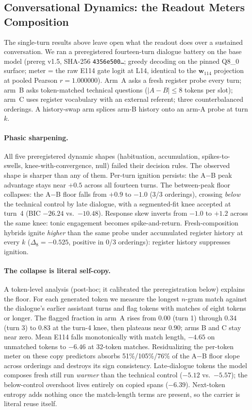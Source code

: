 \documentclass[10pt,a4paper,twocolumn]{article}
\newcommand{\wvec}{\mathbf{w}_{114}}
\begin{document}
\subsection{Conversational Dynamics: the Readout Meters Composition}\label{sec:convdyn}

The single-turn results above leave open what the readout does over a sustained
conversation. We ran a preregistered fourteen-turn dialogue battery on the base
model (prereg v1.5, SHA-256 \texttt{4356e500\ldots}; greedy decoding on the
pinned Q8\_0 surface; meter = the raw E114 gate logit at L14, identical to the
$\wvec$ projection at pooled Pearson $r{=}1.000000$). Arm~A asks a fresh
register probe every turn; arm~B asks token-matched technical questions
($|A{-}B|\le 8$ tokens per slot); arm~C uses register vocabulary with an
external referent; three counterbalanced orderings. A history-swap arm splices
arm-B history onto an arm-A probe at turn $k$.

\paragraph{Phasic sharpening.}
All five preregistered dynamic shapes (habituation, accumulation,
spikes-to-swells, knee-with-convergence, null) failed their decision rules. The
observed shape is sharper than any of them. Per-turn ignition persists: the
A$-$B peak advantage stays near $+0.5$ across all fourteen turns. The
between-peak floor collapses: the A$-$B floor falls from $+0.9$ to $-1.0$
(3/3 orderings), crossing \emph{below} the technical control by late dialogue,
with a segmented-fit knee accepted at turn~4 (BIC $-26.24$ vs.\ $-10.48$).
Response skew inverts from $-1.0$ to $+1.2$ across the same knee: tonic
engagement becomes spike-and-return. Fresh-composition hybrids ignite
\emph{higher} than the same probe under accumulated register history at every
$k$ ($\Delta_8{=}-0.525$, positive in 0/3 orderings): register history
suppresses ignition.

\paragraph{The collapse is literal self-copy.}
A token-level analysis (post-hoc; it calibrated the preregistration below)
explains the floor. For each generated token we measure the longest $n$-gram
match against the dialogue's earlier assistant turns and flag tokens with
matches of eight tokens or longer. The flagged fraction in arm~A rises from
$0.00$ (turn 1) through $0.34$ (turn 3) to $0.83$ at the turn-4 knee, then
plateaus near $0.90$; arms B and C stay near zero. Mean E114 falls
monotonically with match length, $-4.65$ on unmatched tokens to $-6.46$ at
32-token matches. Residualizing the per-token meter on these copy predictors
absorbs 51\%/105\%/76\% of the A$-$B floor slope across orderings and destroys
its sign consistency. Late-dialogue tokens the model composes fresh still run
\emph{warmer} than the technical control ($-5.12$ vs.\ $-5.57$); the
below-control overshoot lives entirely on copied spans ($-6.39$). Next-token
entropy adds nothing once the match-length terms are present, so the carrier is
literal reuse itself.
\end{document}
